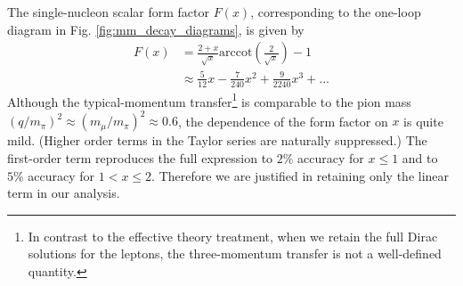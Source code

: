 \documentclass{book}[letterpaper,12pt]
\begin{document}
The single-nucleon scalar form factor $F(x)$, corresponding to the one-loop diagram in Fig. \ref{fig:mm_decay_diagrams}, is given by
\begin{equation}
\begin{split}
F(x)&=\frac{2+x}{\sqrt{x}}\mathrm{arccot}\left(\frac{2}{\sqrt{x}}\right)-1\\
&\approx \frac{5}{12}x-\frac{7}{240}x^2+\frac{9}{2240}x^3+...
\end{split}
\end{equation}
Although the typical-momentum transfer\footnote{In contrast to the effective theory treatment, when we retain the full Dirac solutions for the leptons, the three-momentum transfer is not a well-defined quantity.} is comparable to the pion mass $(q/m_{\pi})^2\approx (m_{\mu}/m_{\pi})^2\approx 0.6$, the dependence of the form factor on $x$ is quite mild. (Higher order terms in the Taylor series are naturally suppressed.) The first-order term reproduces the full expression to $2\%$ accuracy for $x\leq 1$ and to $5\%$ accuracy for $1<x\leq 2$. Therefore we are justified in retaining only the linear term in our analysis.
\end{document}
